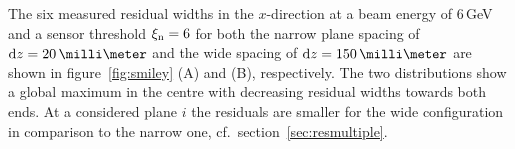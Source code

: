 The six measured residual widths in the $x$-direction at a beam energy of 6\,GeV and a sensor threshold $\xi_{\textrm{n}} = 6$ for both the narrow plane spacing of $\dz = 20\,\milli\meter$
 and the wide spacing of $\dz = 150\,\milli\meter$ are shown in figure~\ref{fig:smiley} (A) and (B), respectively. 
The two distributions show a global maximum in the centre with decreasing residual widths towards both ends. 
At a considered plane $i$ the residuals are smaller for the wide configuration in comparison to the narrow one, cf.~section~\ref{sec:resmultiple}.


%


